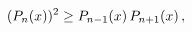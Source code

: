 \[(\mathop{P_{n}\/}\nolimits\!\left(x\right))^{2}\geq\mathop{P_{n-1}\/}\nolimits%
\!\left(x\right)\mathop{P_{n+1}\/}\nolimits\!\left(x\right),\]